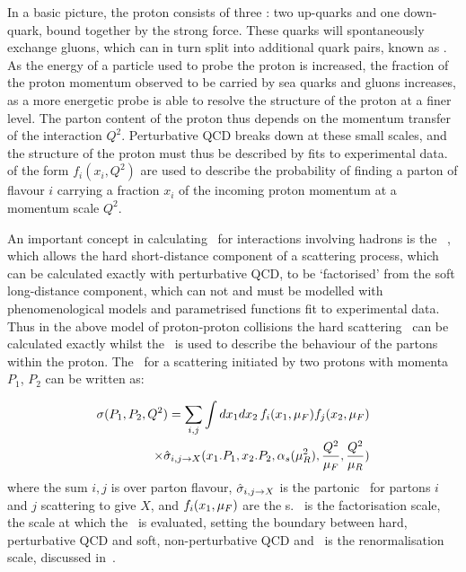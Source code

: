 In a basic picture, the proton consists of three :
two up-quarks and one down-quark, bound together by the strong force. These
quarks will spontaneously exchange gluons, which can in turn split into
additional quark pairs, known as . As the energy of a
particle used to probe the proton is increased, the fraction of the proton
momentum observed to be carried by sea quarks and gluons increases, as a more
energetic probe
is able to resolve the structure of the proton at a finer level. The parton content of
the proton thus depends on the momentum transfer of the interaction $Q^{2}$.
Perturbative QCD breaks down at these small scales, and the structure of the
proton must thus be described by fits to experimental data.  of the form $f_{i}(x_{i}, Q^{2})$ are used to describe the probability of finding a parton of flavour $i$ carrying a
fraction $x_i$ of the incoming proton momentum at a momentum scale $Q^{2}$.

An important concept in calculating \cx\ for interactions involving
hadrons is the ~\cite{ellis2003qcd}, which allows the hard
short-distance component of a scattering process, which can be calculated
exactly with perturbative QCD, to be `factorised' from the soft long-distance
component, which can
not and must be modelled with phenomenological models and parametrised functions
fit to experimental data. Thus in the above model of proton-proton collisions
the hard scattering \cx\ can be calculated exactly whilst the
\partDF\ is used to describe the behaviour of the partons within the proton. The
\cx\ for a scattering initiated by two protons with momenta $P_{1}$, $P_{2}$ can
be written as:

\begin{equation}
\begin{split}
\sigma(P_{1}, P_{2}, Q^{2}) = \sum_{i,j} \int dx_{1} dx_{2} \, f_{i}(x_{1}, \mu_{F})
f_{j}(x_{2}, \mu_{F}) \\
\times \hat{\sigma}_{i,j\rightarrow X} (x_{1}.P_{1}, x_{2}.P_{2}, \alpha_{s}(\mu_{R}^{2}), 
\frac{Q^{2}}{\mu_{F}}, \frac{Q^{2}}{\mu_{R}})
\end{split}
\end{equation}
where the sum $i,j$ is over parton flavour, 
$\hat{\sigma}_{i,j\rightarrow X}$ is the partonic \cx\ for partons $i$ and $j$ 
scattering to give $X$, and  $f_{i}(x_{1}, \mu_{F})$ are the \partDF s. \uF\ is the
factorisation scale, the scale at which the \partDF\ is evaluated, setting the boundary between hard, perturbative QCD and
soft, non-perturbative QCD and \uR\ is the
renormalisation scale, discussed in~.

